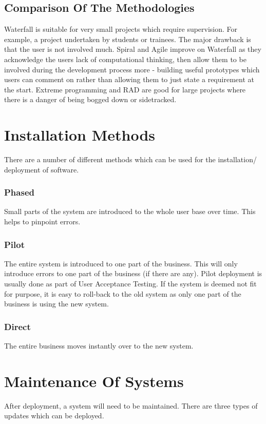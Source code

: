 \documentclass[a4paper,11pt, twocolumn]{article}
\begin{document}
\subsection{Comparison Of The Methodologies}
Waterfall is suitable for very small projects which require supervision. For example, a project undertaken by students or trainees. The major drawback is that the user is not involved much.\newline
Spiral and Agile improve on Waterfall as they acknowledge the users lack of computational thinking, then allow them to be involved during the development process more - building useful prototypes which users can comment on rather than allowing them to just state a requirement at the start.\newline
Extreme programming and RAD are good for large projects where there is a danger of being bogged down or sidetracked. 

\section{Installation Methods}
There are a number of different methods which can be used for the installation/ deployment of software.
\subsubsection*{Phased}
Small parts of the system are introduced to the whole user base over time. This helps to pinpoint errors.
\subsubsection*{Pilot}
The entire system is introduced to one part of the business. This will only introduce errors to one part of the business (if there are any). Pilot deployment is usually done as part of User Acceptance Testing. If the system is deemed not fit for purpose, it is easy to roll-back to the old system as only one part of the business is using the new system.
\subsubsection*{Direct}
The entire business moves instantly over to the new system.

\section{Maintenance Of Systems}
After deployment, a system will need to be maintained. There are three types of updates which can be deployed.
\end{document}
